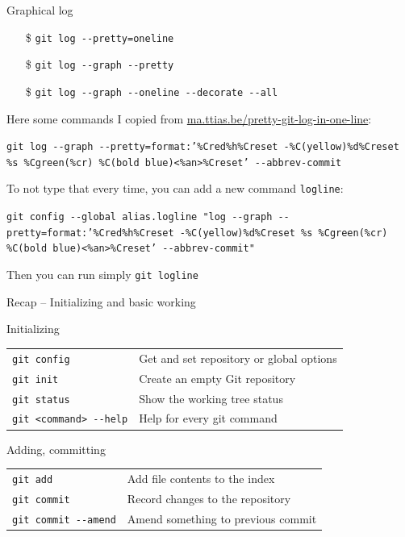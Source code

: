 \documentclass[aspectratio=169]{beamer}
\newcommand{\code}[1]{\texttt{\color{mygreen}#1}}
\begin{document}
\begin{frame}
  {Graphical log}
  \begin{itemize}
    \item[\$] \code{git log -{}-pretty=oneline}
    \item[\$] \code{git log -{}-graph -{}-pretty}
    \item[\$] \code{git log -{}-graph -{}-oneline -{}-decorate -{}-all}
  \end{itemize}

  Here some commands I copied from
  \href{https://ma.ttias.be/pretty-git-log-in-one-line/}%
  {ma.ttias.be/pretty-git-log-in-one-line}:

  {\small
  \code{git log -{}-graph -{}-pretty=format:'\%Cred\%h\%Creset -\%C(yellow)\%d\%Creset \%s \%Cgreen(\%cr) \%C(bold blue)<\%an>\%Creset' -{}-abbrev-commit}
}

  To not type that every time, you can add a new command \code{logline}:

  {\small
  \code{git config -{}-global alias.logline "log -{}-graph -{}-pretty=format:'\%Cred\%h\%Creset -\%C(yellow)\%d\%Creset \%s \%Cgreen(\%cr) \%C(bold blue)<\%an>\%Creset' -{}-abbrev-commit"}
}

  Then you can run simply \code{git logline}

\end{frame}

\begin{frame}
  {Recap -- Initializing and basic working}
  \begin{block}{Initializing}
  \begin{tabular}{ll}
    \code{git config} & Get and set repository or global options\\
    \code{git init}   & Create an empty Git repository\\
    \code{git status} & Show the working tree status\\
    \code{git <command> -{}-help}   & Help for every git command\\
  \end{tabular}
  \end{block}

  \vfill
  \begin{block}{Adding, committing}
  \begin{tabular}{ll}
    \code{git add}    & Add file contents to the index\\
    \code{git commit} & Record changes to the repository\\
    \code{git commit -{}-amend} & Amend something to previous commit\\
  \end{tabular}
  \end{block}
\end{frame}
\end{document}
